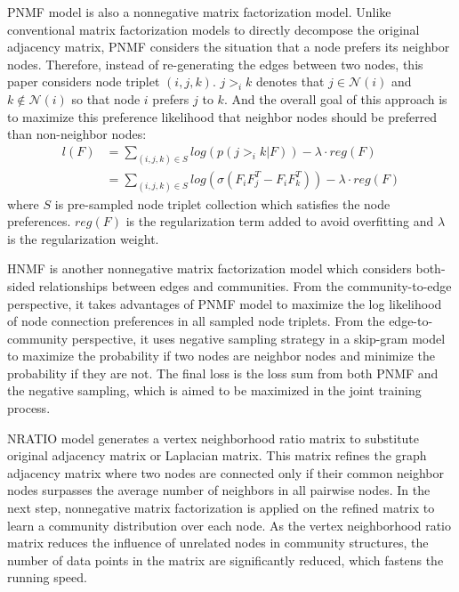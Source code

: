 PNMF model \cite{zhang2015incorporating} is also a nonnegative matrix factorization model.  Unlike conventional matrix factorization models to directly decompose the original adjacency matrix, PNMF considers the situation that a node prefers its neighbor nodes. Therefore, instead of re-generating the edges between two nodes, this paper considers node triplet $(i,j,k)$.  $j>_{i} k$ denotes that $ j \in \mathcal{N}(i)$ and $k \notin \mathcal{N}(i)$ so that node $i$ prefers $j$ to $k$. And the overall goal of this approach is to maximize this preference likelihood that neighbor nodes should be preferred than non-neighbor nodes:
\begin{equation}
\begin{aligned}
l(F) &= \sum_{(i,j,k) \in S} log(p(j>_{i}k|F) )-\lambda \cdot reg(F) \\
 &=  \sum_{(i,j,k) \in S} log(\sigma(F_iF_j^{T} - F_iF_k^{T}))-\lambda \cdot reg(F)
\end{aligned}
\end{equation}
 where $S$ is pre-sampled node triplet collection which satisfies the node preferences. $reg(F)$ is the regularization term added to avoid overfitting and $\lambda$ is the regularization weight.
 
HNMF \cite{zhang2016modeling} is another nonnegative matrix factorization model which considers both-sided relationships between edges and communities. From the community-to-edge perspective, it takes advantages of PNMF model to maximize the log likelihood of node connection preferences in all sampled node triplets. From the edge-to-community perspective, it uses negative sampling strategy in a skip-gram model to maximize the probability if two nodes are neighbor nodes and minimize the probability if they are not. The final loss is the loss sum from both PNMF and the negative sampling, which is aimed to be maximized in the joint training process. 
 
NRATIO model \cite{eustace2015overlapping} generates a vertex neighborhood ratio matrix to substitute original adjacency matrix or Laplacian matrix. This matrix refines the graph adjacency matrix where two nodes are connected only if their common neighbor nodes surpasses the average number of neighbors in all pairwise nodes. In the next step, nonnegative matrix factorization is applied on the refined matrix to learn a community distribution over each node. As the vertex neighborhood ratio matrix reduces the influence of unrelated nodes in community structures, the number of data points in the matrix are significantly reduced, which fastens the running speed.

